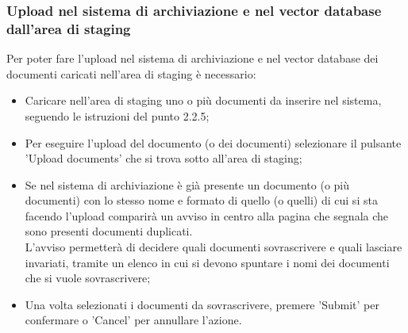 \documentclass[10pt, a4paper]{article}
\begin{document}
\subsubsection{Upload nel sistema di archiviazione e nel vector database dall'area di staging}
Per poter fare l’upload nel sistema di archiviazione e nel vector database dei documenti caricati nell’area di staging è necessario:
\begin{itemize}
    \item Caricare nell'area di staging uno o più documenti da inserire nel sistema, seguendo le istruzioni del punto 2.2.5; 
    \item Per eseguire l'upload del documento (o dei documenti) selezionare il pulsante 'Upload documents' che si trova sotto all'area di staging;
    \item Se nel sistema di archiviazione è già presente un documento (o più documenti) con lo stesso nome e formato di quello (o quelli) di cui si sta facendo l'upload comparirà un avviso in centro alla pagina che segnala che sono presenti documenti duplicati. \\L'avviso permetterà di decidere quali documenti sovrascrivere e quali lasciare invariati, tramite un elenco in cui si devono spuntare i nomi dei documenti che si vuole sovrascrivere;
    \item Una volta selezionati i documenti da sovrascrivere, premere 'Submit' per confermare o 'Cancel' per annullare l'azione.
    
    
\end{itemize}
\end{document}
